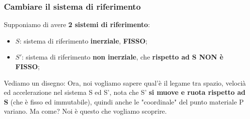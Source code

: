         \subsubsection{Cambiare il sistema di riferimento}
            Supponiamo di avere \textbf{2 sistemi di riferimento}:
            \begin{itemize}
                \item $S$: sistema di riferimento \textbf{inerziale}, \textbf{FISSO};
                \item $S'$: sistema di riferimento \textbf{non inerziale}, che \textbf{rispetto ad S NON è FISSO};
            \end{itemize}
            Vediamo un disegno:
            Ora, noi vogliamo sapere qual'è il legame tra spazio, velocià ed accelerazione nel sistema S ed S', nota che S' \textbf{si muove e ruota rispetto ad S} (che è fisso ed immutabile), quindi anche le "coordinale" del punto materiale P variano. Ma come? Noi è questo che vogliamo scoprire.
